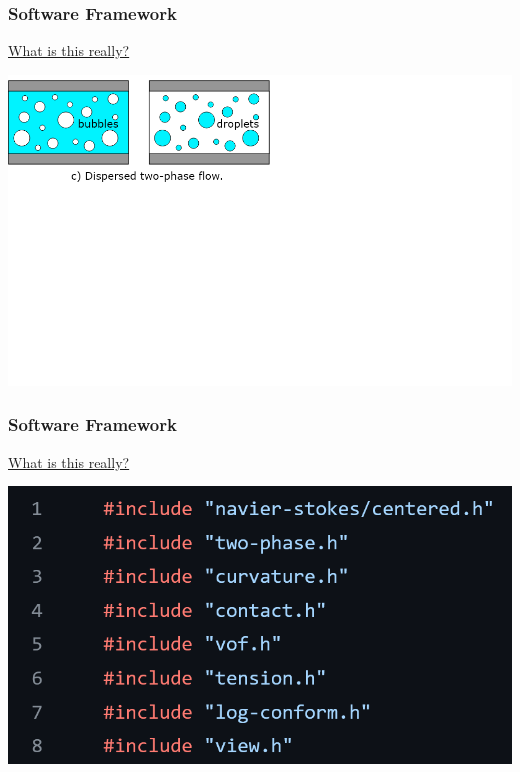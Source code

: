 \documentclass[12pt]{beamer}
\begin{document}
\begin{frame}
    \frametitle{Software Framework}
    \underline{What is this really?}

    \includegraphics[width=1.75\textwidth]{img/6-twophase.png}
\end{frame}
\begin{frame}
    \frametitle{Software Framework}
    \underline{What is this really?}

    \includegraphics[width=\textwidth]{img/5-headers.png}
\end{frame}
\end{document}

